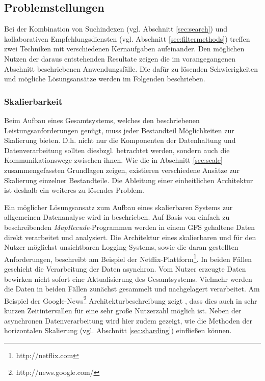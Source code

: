 \subsection{Problemstellungen}

Bei der Kombination von Suchindexen (vgl. Abschnitt \ref{sec:search}) und kollaborativen Empfehlungsdiensten (vgl. Abschnitt \ref{sec:filtermethods}) treffen zwei Techniken mit verschiedenen Kernaufgaben aufeinander. Den möglichen Nutzen der daraus entstehenden Resultate zeigen die im vorangegangenen Abschnitt beschriebenen Anwendungsfälle. Die dafür zu lösenden Schwierigkeiten und mögliche Lösungsansätze werden im Folgenden beschrieben.

\subsubsection{Skalierbarkeit}\label{sec:scale2}

Beim Aufbau eines  Gesamtsystems, welches den beschriebenen Leistungsanforderungen genügt, muss jeder Bestandteil Möglichkeiten zur Skalierung bieten. D.h. nicht nur die Komponenten der Datenhaltung und Datenverarbeitung sollten diesbzgl. betrachtet werden, sondern auch die Kommunikationswege zwischen ihnen. Wie die in Abschnitt \ref{sec:scale} zusammengefassten Grundlagen zeigen, existieren verschiedene Ansätze zur Skalierung einzelner Bestandteile. Die Ableitung einer einheitlichen Architektur ist deshalb ein weiteres zu lösendes Problem.

Ein möglicher Lösungsansatz zum Aufbau eines skalierbaren Systems zur allgemeinen Datenanalyse wird in \citep{Lin2012} beschrieben. Auf Basis von einfach zu beschreibenden \textit{MapRecude}-Programmen werden in einem \acs{GFS} gehaltene Daten direkt verarbeitet und analysiert. Die Architektur eines skalierbaren und für den Nutzer möglichst unsichtbaren Logging-Systems, sowie die daran gestellten Anforderungen, beschreibt \citep{netflix2012} am Beispiel der Netflix-Plattform\footnote{http://netflix.com}. In beiden Fällen geschieht die Verarbeitung der Daten asynchron. Vom Nutzer erzeugte Daten bewirken nicht sofort eine Aktualisierung des Gesamtsystems. Vielmehr werden die Daten in beiden Fällen zunächst gesammelt und nachgelagert verarbeitet. Am Beispiel der Google-News\footnote{http://news.google.com/} Architekturbeschreibung zeigt \citep{Das07}, dass dies auch in sehr kurzen Zeitintervallen für eine sehr große Nutzerzahl möglich ist. Neben der asynchronen Datenverarbeitung wird hier zudem gezeigt, wie die Methoden der horizontalen Skalierung (vgl. Abschnitt \ref{sec:sharding}) einfließen können.

